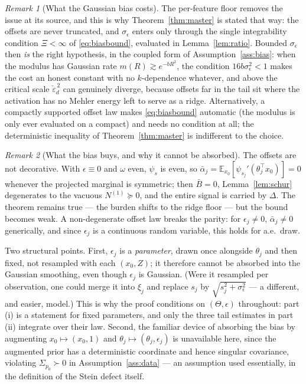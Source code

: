 \documentclass[11pt]{article}
\theoremstyle{remark}
\newtheorem{remark}{Remark}
\newcommand{\E}{\mathbb{E}}
\newcommand{\Sig}{\Sigma_{p_0}}
\begin{document}
\begin{remark}[What the Gaussian bias costs]
The per-feature floor removes the issue at its source, and this is why Theorem~\ref{thm:master} is stated that way: the offsets are never truncated, and $\sigma_\epsilon$ enters only through the single integrability condition $\Xi < \infty$ of \eqref{eq:biasbound}, evaluated in Lemma~\ref{lem:ratio}. Bounded $\sigma_\epsilon$ then \emph{is} the right hypothesis, in the coupled form of Assumption~\ref{ass:bias}: when the modulus has Gaussian rate $m(R) \gtrsim e^{-bR^2}$, the condition $16b\sigma_\epsilon^2 < 1$ makes the cost an honest constant with no $k$-dependence whatever, and above the critical scale $\check\varepsilon_d^{\,2}$ can genuinely diverge, because offsets far in the tail sit where the activation has no Mehler energy left to serve as a ridge. Alternatively, a compactly supported offset law makes \eqref{eq:biasbound} automatic (the modulus is only ever evaluated on a compact) and needs no condition at all; the deterministic inequality of Theorem~\ref{thm:master} is indifferent to the choice.
\end{remark}

\begin{remark}[What the bias buys, and why it cannot be absorbed]\label{rem:bias-role}
The offsets are not decorative. With $\epsilon \equiv 0$ and $\omega$ even, $\psi_s$ is even, so $\bar\alpha_j = \E_{x_0}[\psi_{s_j}'(\theta_j^\top x_0)] = 0$ whenever the projected marginal is symmetric; then $\bar B = 0$, Lemma~\ref{lem:schur} degenerates to the vacuous $N^{(1)} \succeq 0$, and the entire signal is carried by $\Delta$. The theorem remains true --- the burden shifts to the ridge floor --- but the bound becomes weak. A non-degenerate offset law breaks the parity: for $\epsilon_j \ne 0$, $\bar\alpha_j \ne 0$ generically, and since $\epsilon_j$ is a continuous random variable, this holds for a.e.\ draw.

Two structural points. First, $\epsilon_j$ is a \emph{parameter}, drawn once alongside $\theta_j$ and then fixed, not resampled with each $(x_0,Z)$; it therefore cannot be absorbed into the Gaussian smoothing, even though $\epsilon_j$ is Gaussian. (Were it resampled per observation, one could merge it into $\xi_j$ and replace $s_j$ by $\sqrt{s_j^2 + \sigma_\epsilon^2}$ --- a different, and easier, model.) This is why the proof conditions on $(\Theta,\epsilon)$ throughout: part (i) is a statement for fixed parameters, and only the three tail estimates in part (ii) integrate over their law. Second, the familiar device of absorbing the bias by augmenting $x_0 \mapsto (x_0, 1)$ and $\theta_j \mapsto (\theta_j, \epsilon_j)$ is unavailable here, since the augmented prior has a deterministic coordinate and hence singular covariance, violating $\Sig \succ 0$ in Assumption~\ref{ass:data} --- an assumption used essentially, in the definition of the Stein defect itself.
\end{remark}
\end{document}
